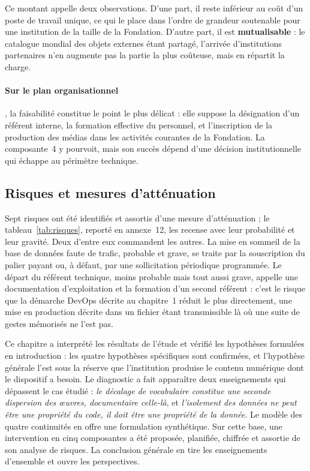 Ce montant appelle deux observations. D'une part, il reste inférieur au coût
d'un poste de travail unique, ce qui le place dans l'ordre de grandeur
soutenable pour une institution de la taille de la Fondation. D'autre part, il
est \textbf{mutualisable} : le catalogue mondial des objets externes étant
partagé, l'arrivée d'institutions partenaires n'en augmente pas la partie la
plus coûteuse, mais en répartit la charge.

\paragraph{Sur le plan organisationnel}, la faisabilité constitue le point le plus délicat : elle suppose la désignation d'un
référent interne, la formation effective du personnel, et l'inscription de la
production des médias dans les activités courantes de la Fondation. La composante~4 y pourvoit, mais son succès dépend d'une décision institutionnelle
qui échappe au périmètre technique.

\subsection{Risques et mesures d'atténuation}

Sept risques ont été identifiés et assortis d'une mesure d'atténuation ; le
tableau~\ref{tab:risques}, reporté en annexe~12, les recense avec leur
probabilité et leur gravité. Deux d'entre eux commandent les autres. La mise en
sommeil de la base de données faute de trafic, probable et grave, se traite par
la souscription du palier payant ou, à défaut, par une sollicitation périodique
programmée. Le départ du référent technique, moins probable mais tout aussi
grave, appelle une documentation d'exploitation et la formation d'un second
référent : c'est le risque que la démarche DevOps décrite au chapitre~1 réduit
le plus directement, une mise en production décrite dans un fichier étant
transmissible là où une suite de gestes mémorisés ne l'est pas.

\conclchap

Ce chapitre a interprété les résultats de l'étude et vérifié les hypothèses
formulées en introduction : les quatre hypothèses spécifiques sont confirmées,
et l'hypothèse générale l'est sous la réserve que l'institution produise le
contenu numérique dont le dispositif a besoin. Le diagnostic a fait apparaître
deux enseignements qui dépassent le cas étudié : \emph{le décalage de
vocabulaire constitue une seconde dispersion des œuvres, documentaire celle-là},
et \emph{l'isolement des données ne peut être une propriété du code, il doit
être une propriété de la donnée}. Le modèle des quatre continuités en offre une
formulation synthétique. Sur cette base, une intervention en cinq composantes a
été proposée, planifiée, chiffrée et assortie de son analyse de risques. La
conclusion générale en tire les enseignements d'ensemble et ouvre les
perspectives.
